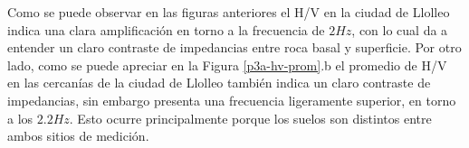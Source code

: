 Como se puede observar en las figuras anteriores el H/V en la ciudad de Llolleo indica una clara amplificación en torno a la frecuencia de $2Hz$, con lo cual da a entender un claro contraste de impedancias entre roca basal y superficie. Por otro lado, como se puede apreciar en la Figura \ref{p3a-hv-prom}.b el promedio de H/V en las cercanías de la ciudad de Llolleo también indica un claro contraste de impedancias, sin embargo presenta una frecuencia ligeramente superior, en torno a los $2.2Hz$. Esto ocurre principalmente porque los suelos son distintos entre ambos sitios de medición.
